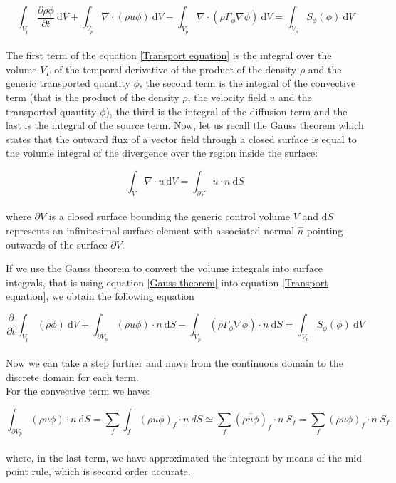 \documentclass[a5paper]{sapthesis}
\begin{document}
	\begin{equation} 
		\int_{V_{p}}{{\dfrac{\partial{\rho \phi}}{\partial{t}}}}\ \mathrm{d}V + \int_{V_{p}}{\nabla \cdot (\rho u \phi)}\ \mathrm{d}V - \int_{V_{p}}{\nabla \cdot (\rho \Gamma_{\phi} \nabla\phi)}\ \mathrm{d}V = \int_{V_{p}}{S_{\phi}(\phi)}\ \mathrm{d}V
		\label{Transport equation}
	\end{equation}
	\\
	The first term of the equation \ref{Transport equation} is the integral over the volume $V_{P}$ of the temporal derivative of the product of the density $\rho$ and the generic transported quantity $\phi$, the second term is the integral of the convective term (that is the product of the density $\rho$, the velocity field $u$ and the transported quantity $\phi$), the third is the integral of the diffusion term and the last is the integral of the source term. 
	Now, let us recall the Gauss theorem which states that the outward flux of a vector field through a closed surface is equal to the volume integral of the divergence over the region inside the surface:
	
	\begin{equation}
		\int_{V}{\nabla \cdot u \ }\mathrm{d}V = \int_{\partial{V}}{u \cdot n \ \mathrm{d}S}
		\label{Gauss theorem}
	\end{equation}
	\\
	where $\partial{V}$ is a closed surface bounding the generic control volume $V$ and $\mathrm{d}S$ represents an infinitesimal surface element with associated normal $\hat{n}$ pointing outwards of the surface $\partial{V}$.
	
	If we use the Gauss theorem to convert the volume integrals into surface integrals, that is using equation \ref{Gauss theorem} into equation \ref{Transport equation}, we obtain the following equation
	
	\begin{equation}
		\dfrac{\partial}{\partial{t}}\int_{V_{p}}{{(\rho \phi)}}\ \mathrm{d}V + \int_{\partial{V_{p}}}{ (\rho u \phi)\cdot n}\ \mathrm{d}S - \int_{V_{p}}{(\rho \Gamma_{\phi} \nabla\phi)\cdot n}\ \mathrm{d}S = \int_{V_{p}}{S_{\phi}(\phi)}\ \mathrm{d}V
		\label{Transport equation_2}
	\end{equation}
	\\
	Now we can take a step further and move from the continuous domain to the discrete domain for each term.\\ 
	\indent For the convective term we have:
	
	\begin{equation}
		\int_{\partial{V_{p}}}{(\rho u \phi)} \cdot n \ \mathrm{d}S = \sum_{f}\int_{f}{(\rho u \phi)_{f}} \cdot n \ dS \simeq \sum_{f} (\overline{\rho u \phi})_{f} \cdot n \ S_{f} = \sum_{f} (\rho u \phi)_{f} \cdot n \ S_{f}
		\label{convective discrete}
	\end{equation}
	\\
	where, in the last term, we have approximated the integrant by means of the mid point rule, which is second order accurate.
	
\end{document}
